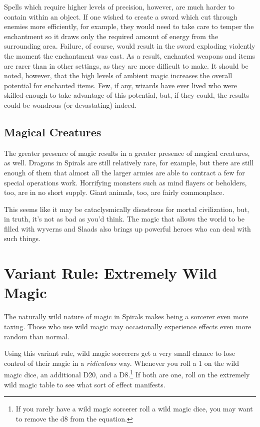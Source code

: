 \begin{multicols}{2}
Spells which require higher levels of precision, however, are much harder to contain within an object.
If one wished to create a sword which cut through enemies more efficiently, for example, they would need to take care to temper the enchantment so it draws only the required amount of energy from the surrounding area.
Failure, of course, would result in the sword exploding violently the moment the enchantment was cast.
As a result, enchanted weapons and items are rarer than in other settings, as they are more difficult to make.
It should be noted, however, that the high levels of ambient magic increases the overall potential for enchanted items.
Few, if any, wizards have ever lived who were skilled enough to take advantage of this potential, but, if they could, the results could be wondrous (or devastating) indeed.

\subsection{Magical Creatures}
The greater presence of magic results in a greater presence of magical creatures, as well.
Dragons in Spirals are still relatively rare, for example, but there are still enough of them that almost all the larger armies are able to contract a few for special operations work.
Horrifying monsters such as mind flayers or beholders, too, are in no short supply.
Giant animals, too, are fairly commonplace.

This seems like it may be cataclysmically disastrous for mortal civilization, but, in truth, it's not as bad as you'd think.
The magic that allows the world to be filled with wyverns and Slaads also brings up powerful heroes who can deal with such things.

\end{multicols}


\section{Variant Rule: Extremely Wild Magic}
The naturally wild nature of magic in Spirals makes being a sorcerer even more taxing.
Those who use wild magic may occasionally experience effects even more random than normal.

Using this variant rule, wild magic sorcerers get a very small chance to lose control of their magic in a \textit{ridiculous} way.
Whenever you roll a 1 on the wild magic dice, an additional D20, and a D8.\footnote{If you rarely have a wild magic sorcerer roll a wild magic dice, you may want to remove the d8 from the equation.}
If both are one, roll on the extremely wild magic table to see what sort of effect manifests.

